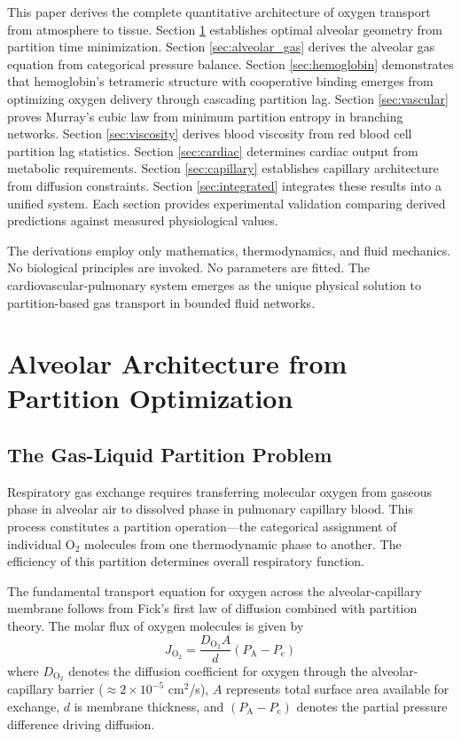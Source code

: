 \documentclass[12pt,a4paper]{article}
\theoremstyle{remark}
\begin{document}
This paper derives the complete quantitative architecture of oxygen transport from atmosphere to tissue. Section \ref{sec:alveolar_architecture} establishes optimal alveolar geometry from partition time minimization. Section \ref{sec:alveolar_gas} derives the alveolar gas equation from categorical pressure balance. Section \ref{sec:hemoglobin} demonstrates that hemoglobin's tetrameric structure with cooperative binding emerges from optimizing oxygen delivery through cascading partition lag. Section \ref{sec:vascular} proves Murray's cubic law from minimum partition entropy in branching networks. Section \ref{sec:viscosity} derives blood viscosity from red blood cell partition lag statistics. Section \ref{sec:cardiac} determines cardiac output from metabolic requirements. Section \ref{sec:capillary} establishes capillary architecture from diffusion constraints. Section \ref{sec:integrated} integrates these results into a unified system. Each section provides experimental validation comparing derived predictions against measured physiological values.

The derivations employ only mathematics, thermodynamics, and fluid mechanics. No biological principles are invoked. No parameters are fitted. The cardiovascular-pulmonary system emerges as the unique physical solution to partition-based gas transport in bounded fluid networks.

\section{Alveolar Architecture from Partition Optimization}
\label{sec:alveolar_architecture}

\subsection{The Gas-Liquid Partition Problem}

Respiratory gas exchange requires transferring molecular oxygen from gaseous phase in alveolar air to dissolved phase in pulmonary capillary blood. This process constitutes a partition operation—the categorical assignment of individual O$_{2}$ molecules from one thermodynamic phase to another. The efficiency of this partition determines overall respiratory function.

The fundamental transport equation for oxygen across the alveolar-capillary membrane follows from Fick's first law of diffusion combined with partition theory. The molar flux of oxygen molecules is given by
\begin{equation}
J_{\mathrm{O}_{2}} = \frac{D_{\mathrm{O}_{2}} A}{d} (P_{\mathrm{A}} - P_{\mathrm{c}})
\label{eq:oxygen_flux}
\end{equation}
where $D_{\mathrm{O}_{2}}$ denotes the diffusion coefficient for oxygen through the alveolar-capillary barrier ($\approx 2 \times 10^{-5}$ cm$^{2}$/s), $A$ represents total surface area available for exchange, $d$ is membrane thickness, and $(P_{\mathrm{A}} - P_{\mathrm{c}})$ denotes the partial pressure difference driving diffusion.
\end{document}
